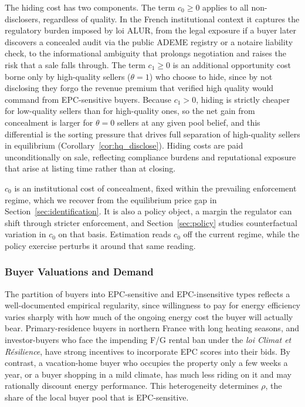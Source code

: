 The hiding cost has two components. The term $c_0\geq 0$ applies to all non-disclosers, regardless of quality. In the French institutional context it captures the regulatory burden imposed by loi ALUR, from the legal exposure if a buyer later discovers a concealed audit via the public ADEME registry or a notaire liability check, to the informational ambiguity that prolongs negotiation and raises the risk that a sale falls through. The term $c_1\geq 0$ is an additional opportunity cost borne only by high-quality sellers ($\theta=1$) who choose to hide, since by not disclosing they forgo the revenue premium that verified high quality would command from EPC-sensitive buyers. Because $c_1>0$, hiding is strictly cheaper for low-quality sellers than for high-quality ones, so the net gain from concealment is larger for $\theta=0$ sellers at any given pool belief, and this differential is the sorting pressure that drives full separation of high-quality sellers in equilibrium (Corollary~\ref{cor:hq_disclose}). Hiding costs are paid unconditionally on sale, reflecting compliance burdens and reputational exposure that arise at listing time rather than at closing.

$c_0$ is an institutional cost of concealment, fixed within the prevailing enforcement regime, which we recover from the equilibrium price gap in Section~\ref{sec:identification}. It is also a policy object, a margin the regulator can shift through stricter enforcement, and Section~\ref{sec:policy} studies counterfactual variation in $c_0$ on that basis. Estimation reads $c_0$ off the current regime, while the policy exercise perturbs it around that same reading.

\subsubsection{Buyer Valuations and Demand}

The partition of buyers into EPC-sensitive and EPC-insensitive types reflects a well-documented empirical regularity, since willingness to pay for energy efficiency varies sharply with how much of the ongoing energy cost the buyer will actually bear. Primary-residence buyers in northern France with long heating seasons, and investor-buyers who face the impending F/G rental ban under the \textit{loi Climat et R\'{e}silience}, have strong incentives to incorporate EPC scores into their bids. By contrast, a vacation-home buyer who occupies the property only a few weeks a year, or a buyer shopping in a mild climate, has much less riding on it and may rationally discount energy performance. This heterogeneity determines $\rho$, the share of the local buyer pool that is EPC-sensitive.

